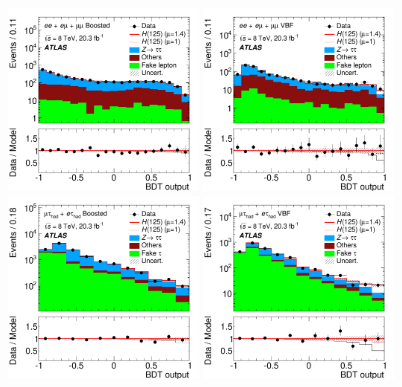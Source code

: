 \clearpage
\begin{figure}[tp]
  \centering
  \includegraphics[width=0.45\textwidth]{figures/HIGG-2013-32/fig_08b}
  \includegraphics[width=0.45\textwidth]{figures/HIGG-2013-32/fig_08a}
  \includegraphics[width=0.45\textwidth]{figures/HIGG-2013-32/fig_08d}
  \includegraphics[width=0.45\textwidth]{figures/HIGG-2013-32/fig_08c}

\end{figure}
